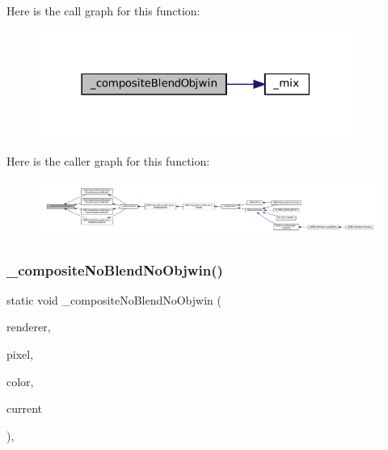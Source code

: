 Here is the call graph for this function\+:
\nopagebreak
\begin{figure}[H]
\begin{center}
\leavevmode
\includegraphics[width=291pt]{software-private_8h_a194890ebd968b26526048988c98e3f7a_cgraph}
\end{center}
\end{figure}
Here is the caller graph for this function\+:
\nopagebreak
\begin{figure}[H]
\begin{center}
\leavevmode
\includegraphics[width=350pt]{software-private_8h_a194890ebd968b26526048988c98e3f7a_icgraph}
\end{center}
\end{figure}
\mbox{\label{software-private_8h_ab5f6e59594dee5b7f6ec7d9e5b5fa91f}} 
\subsubsection{\texorpdfstring{\+\_\+composite\+No\+Blend\+No\+Objwin()}{\_compositeNoBlendNoObjwin()}}
{\footnotesize\ttfamily static void \+\_\+composite\+No\+Blend\+No\+Objwin (\begin{DoxyParamCaption}\item[{struct G\+B\+A\+Video\+Software\+Renderer $\ast$}]{renderer,  }\item[{uint32\+\_\+t $\ast$}]{pixel,  }\item[{uint32\+\_\+t}]{color,  }\item[{uint32\+\_\+t}]{current }\end{DoxyParamCaption})\hspace{0.3cm}{\ttfamily [inline]}, {\ttfamily [static]}}

